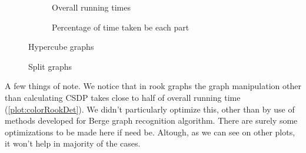 \begin{figure}
  \begin{subfigure}{.5\textwidth}
    \centering
    
    \caption{Overall running times}
  \end{subfigure}%
  \begin{subfigure}{.5\textwidth}
    \centering
    
    \caption{Percentage of time taken be each part}
  \end{subfigure}
  \caption{Hypercube graphs}
\end{figure}

\begin{figure}
  \caption{Split graphs}
\end{figure}

A few things of note. We notice that in rook graphs the graph manipulation other than calculating CSDP takes close to half of overall running time (\cref{plot:colorRookDet}). We didn't particularly optimize this, other than by use of methods developed for Berge graph recognition algorithm. There are surely some optimizations to be made here if need be. Altough, as we can see on other plots, it won't help in majority of the cases.